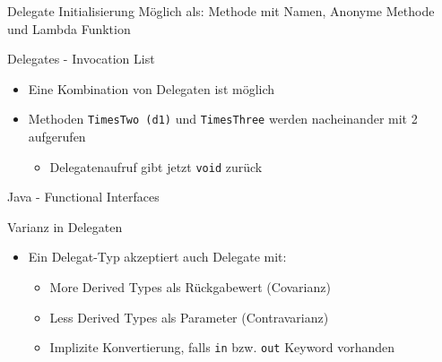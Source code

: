 \documentclass[11pt]{beamer}
\begin{document}
\begin{frame}{Delegate}
	Initialisierung Möglich als: Methode mit Namen, Anonyme Methode und Lambda Funktion
\end{frame}

\begin{frame}{Delegates - Invocation List}
	\begin{itemize}
		\item  Eine Kombination von Delegaten ist möglich
		\item Methoden \texttt{TimesTwo (d1)} und \texttt{TimesThree} werden nacheinander mit 2 aufgerufen
		\begin{itemize}
			\item Delegatenaufruf gibt jetzt \texttt{void} zurück
		\end{itemize}
	\end{itemize}
\end{frame}

\begin{frame}{Java - Functional Interfaces}

\end{frame}

\begin{frame}{Varianz in Delegaten}
	\begin{itemize}
	 	\item Ein Delegat-Typ akzeptiert auch Delegate mit:
	 	\begin{itemize}
	 		\item \glqq More Derived Types\grqq{} als Rückgabewert (Covarianz)
	 		\item \glqq Less Derived Types\grqq{} als Parameter (Contravarianz)
	 		\item Implizite Konvertierung, falls \texttt{in} bzw. \texttt{out} Keyword vorhanden
	 	\end{itemize}
	\end{itemize}
\end{frame}
\end{document}
